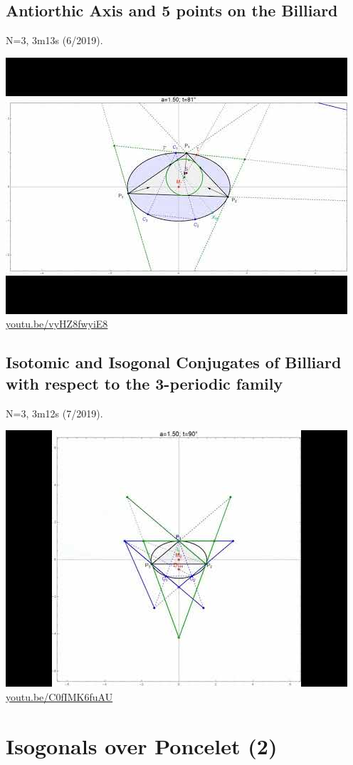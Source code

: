 \documentclass[12pt]{amsart}
\begin{document}
\subsection{Antiorthic Axis and 5 points on the Billiard}
\label{vid:vyHZ8fwyiE8}
\noindent N=3, 3m13s (6/2019). 
\begin{center}\includegraphics[width=.5\textwidth]{pics/vyHZ8fwyiE8.jpg} \\ 
\href{https://youtu.be/vyHZ8fwyiE8}{\url{youtu.be/vyHZ8fwyiE8}}\end{center}
% 

\subsection{Isotomic and Isogonal Conjugates of Billiard with respect to the 3-periodic family}
\label{vid:C0fIMK6fuAU}
\noindent N=3, 3m12s (7/2019). 
\begin{center}\includegraphics[width=.5\textwidth]{pics/C0fIMK6fuAU.jpg} \\ 
\href{https://youtu.be/C0fIMK6fuAU}{\url{youtu.be/C0fIMK6fuAU}}\end{center}
% 


\section{Isogonals over Poncelet (2)}
\end{document}
